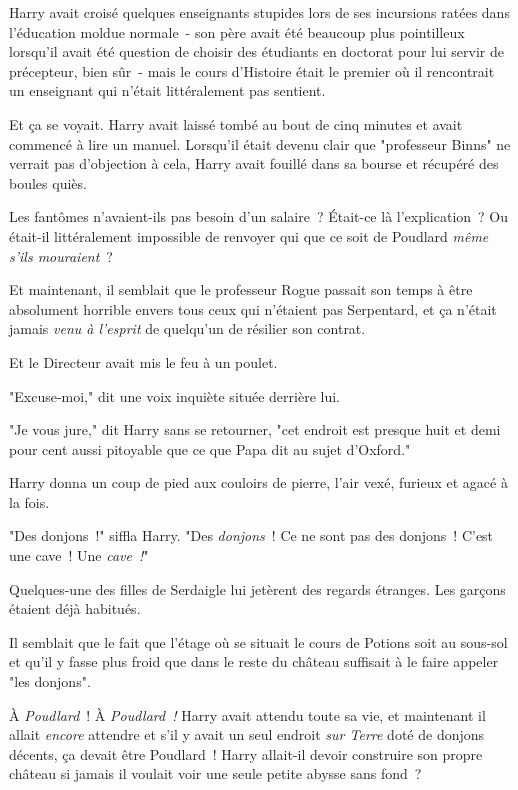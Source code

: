 Harry avait croisé quelques enseignants stupides lors de ses incursions ratées dans l'éducation moldue normale~- son père avait été beaucoup plus pointilleux lorsqu'il avait été question de choisir des étudiants en doctorat pour lui servir de précepteur, bien sûr~- mais le cours d'Histoire était le premier où il rencontrait un enseignant qui n'était littéralement pas sentient.

Et ça se voyait. Harry avait laissé tombé au bout de cinq minutes et avait commencé à lire un manuel. Lorsqu'il était devenu clair que "professeur Binns" ne verrait pas d'objection à cela, Harry avait fouillé dans sa bourse et récupéré des boules quiès.

Les fantômes n'avaient-ils pas besoin d'un salaire~? Était-ce là l'explication~? Ou était-il littéralement impossible de renvoyer qui que ce soit de Poudlard \emph{même s'ils mouraient}~?

Et maintenant, il semblait que le professeur Rogue passait son temps à être absolument horrible envers tous ceux qui n'étaient pas Serpentard, et ça n'était jamais \emph{venu à l'esprit} de quelqu'un de résilier son contrat.

Et le Directeur avait mis le feu à un poulet.

"Excuse-moi," dit une voix inquiète située derrière lui.

"Je vous jure," dit Harry sans se retourner, "cet endroit est presque huit et demi pour cent aussi pitoyable que ce que Papa dit au sujet d'Oxford."

\later

Harry donna un coup de pied aux couloirs de pierre, l'air vexé, furieux et agacé à la fois.

"Des donjons~!" siffla Harry. "Des \emph{donjons}~! Ce ne sont pas des donjons~! C'est une cave~! Une \emph{cave~!}"

Quelques-une des filles de Serdaigle lui jetèrent des regards étranges. Les garçons étaient déjà habitués.

Il semblait que le fait que l'étage où se situait le cours de Potions soit au sous-sol et qu'il y fasse plus froid que dans le reste du château suffisait à le faire appeler "les donjons".

À \emph{Poudlard}~! À \emph{Poudlard~!} Harry avait attendu toute sa vie, et maintenant il allait \emph{encore} attendre et s'il y avait un seul endroit \emph{sur Terre} doté de donjons décents, ça devait être Poudlard~! Harry allait-il devoir construire son propre château si jamais il voulait voir une seule petite abysse sans fond~?

